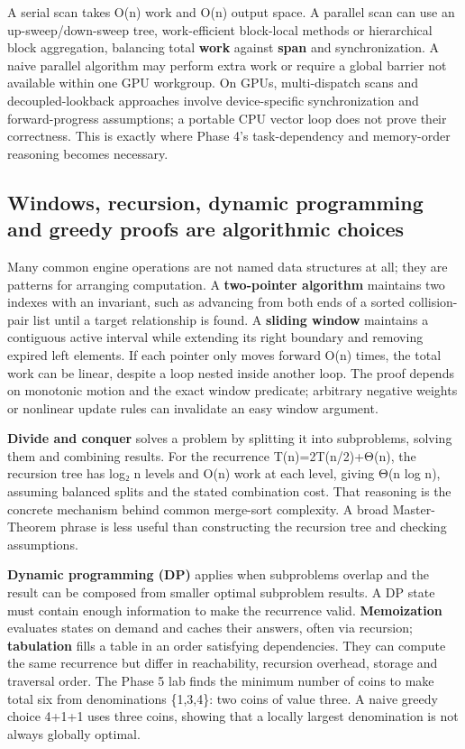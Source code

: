 A serial scan takes O(n) work and O(n) output space. A parallel scan can use an up-sweep/down-sweep tree, work-efficient block-local methods or hierarchical block aggregation, balancing total \textbf{work} against \textbf{span} and synchronization. A naive parallel algorithm may perform extra work or require a global barrier not available within one GPU workgroup. On GPUs, multi-dispatch scans and decoupled-lookback approaches involve device-specific synchronization and forward-progress assumptions; a portable CPU vector loop does not prove their correctness. This is exactly where Phase 4's task-dependency and memory-order reasoning becomes necessary.

\subsection{Windows, recursion, dynamic programming and greedy proofs are algorithmic choices}\label{01-foundations-i-ch008-windows-recursion-dynamic-programming-and-greedy-proofs-are-algorithmic-choices}

\hypertarget{01-foundations-i-ch008-windows-recursion-dynamic-programming-and-greedy-proofs-are-algorithmic-choices}{}

Many common engine operations are not named data structures at all; they are patterns for arranging computation. A \textbf{two-pointer algorithm} maintains two indexes with an invariant, such as advancing from both ends of a sorted collision-pair list until a target relationship is found. A \textbf{sliding window} maintains a contiguous active interval while extending its right boundary and removing expired left elements. If each pointer only moves forward O(n) times, the total work can be linear, despite a loop nested inside another loop. The proof depends on monotonic motion and the exact window predicate; arbitrary negative weights or nonlinear update rules can invalidate an easy window argument.

\textbf{Divide and conquer} solves a problem by splitting it into subproblems, solving them and combining results. For the recurrence T(n)=2T(n/2)+Θ(n), the recursion tree has log₂ n levels and O(n) work at each level, giving Θ(n log n), assuming balanced splits and the stated combination cost. That reasoning is the concrete mechanism behind common merge-sort complexity. A broad Master-Theorem phrase is less useful than constructing the recursion tree and checking assumptions.

\textbf{Dynamic programming (DP)} applies when subproblems overlap and the result can be composed from smaller optimal subproblem results. A DP state must contain enough information to make the recurrence valid. \textbf{Memoization} evaluates states on demand and caches their answers, often via recursion; \textbf{tabulation} fills a table in an order satisfying dependencies. They can compute the same recurrence but differ in reachability, recursion overhead, storage and traversal order. The Phase 5 lab finds the minimum number of coins to make total six from denominations \{1,3,4\}: two coins of value three. A naive greedy choice 4+1+1 uses three coins, showing that a locally largest denomination is not always globally optimal.

